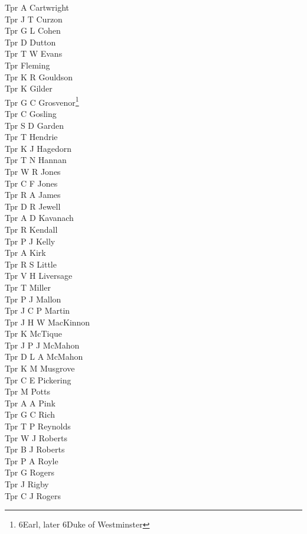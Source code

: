 \begin{multicols}{4}
  Tpr A Cartwright \\
  Tpr J T Curzon \\
  Tpr G L Cohen \\
  Tpr D Dutton \\
  Tpr T W Evans \\
  Tpr Fleming \\
  Tpr K R Gouldson \\
  Tpr K Gilder \\
  Tpr G C Grosvenor\footnote{6\nth Earl, later 6\nth Duke of Westminster} \\
  Tpr C Gosling \\
  Tpr S D Garden \\
  Tpr T Hendrie \\
  Tpr K J Hagedorn \\
  Tpr T N Hannan \\
  Tpr W R Jones \\
  Tpr C F Jones \\
  Tpr R A James \\
  Tpr D R Jewell \\
  Tpr A D Kavanach \\
  Tpr R Kendall \\
  Tpr P J Kelly \\
  Tpr A Kirk \\
  Tpr R S Little \\
  Tpr V H Liversage \\
  Tpr T Miller \\
  Tpr P J Mallon \\
  Tpr J C P Martin \\
  Tpr J H W MacKinnon \\
  Tpr K McTique \\
  Tpr J P J McMahon \\
  Tpr D L A McMahon \\
  Tpr K M Musgrove \\
  Tpr C E Pickering \\
  Tpr M Potts \\
  Tpr A A Pink \\
  Tpr G C Rich \\
  Tpr T P Reynolds \\
  Tpr W J Roberts \\
  Tpr B J Roberts \\
  Tpr P A Royle \\
  Tpr G Rogers \\
  Tpr J Rigby \\
  Tpr C J Rogers \\

\end{multicols}
